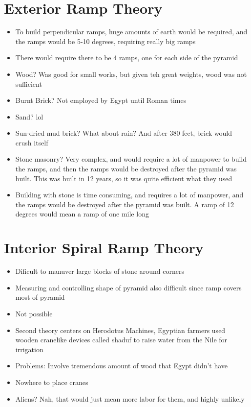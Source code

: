 \documentclass{article}
\begin{document}
\section*{Exterior Ramp Theory}
\begin{itemize}
  \item To build perpendicular ramps, huge amounts of
    earth would be required, and the ramps would be 5-10 degrees,
    requiring really big ramps
  \item There would require there to be 4 ramps, one for each side of the pyramid
  \item Wood? Was good for small works, but given teh great weights, wood was not sufficient
  \item Burnt Brick? Not employed by Egypt until Roman times
  \item Sand? lol
  \item Sun-dried mud brick? What about rain? And after 380 feet, brick would crush itself
  \item Stone masonry? Very complex, and would require
    a lot of manpower to build the ramps, and then
    the ramps would be destroyed after the pyramid was built.
    This was built in 12 years, so it was quite efficient what they used
  \item Building with stone is time consuming, and
    requires a lot of manpower, and the ramps would be destroyed after the pyramid was built.
    A ramp of 12 degrees would mean a ramp of one mile long
\end{itemize}

\section*{Interior Spiral Ramp Theory}
\begin{itemize}
  \item Dificult to manuver large blocks of stone around corners
  \item Measuring and controlling shape of pyramid also difficult since ramp covers most of pyramid
  \item Not possible
  \item Second theory centers on Herodotus Machines, Egyptian farmers used wooden cranelike devices
    called shaduf to raise water from the Nile for irrigation
  \item Problems: Involve tremendous amount of wood that Egypt didn't have
  \item Nowhere to place cranes
  \item Aliens? Nah, that would just mean more labor for them, and highly unlikely
\end{itemize}
\end{document}
